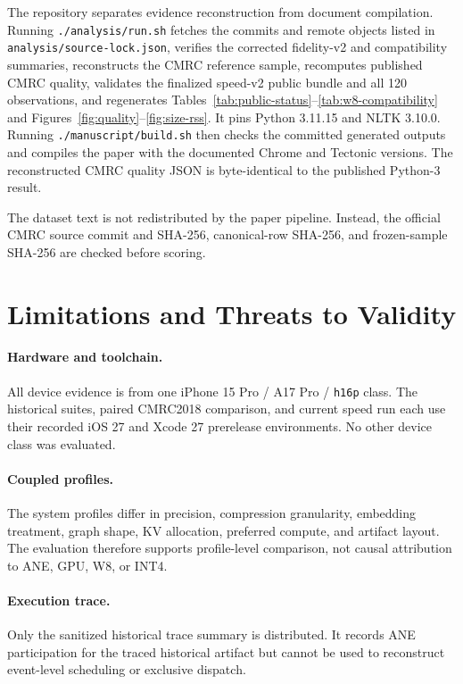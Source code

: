 \documentclass[10pt]{article}
\DeclareRobustCommand{\evidence}[1]{}
\DeclareRobustCommand{\artifact}[1]{\nolinkurl{#1}}
\begin{document}
The repository separates evidence reconstruction from document compilation. Running \artifact{./analysis/run.sh} fetches the commits and remote objects listed in \artifact{analysis/source-lock.json}, verifies the corrected fidelity-v2 and compatibility summaries, reconstructs the CMRC reference sample, recomputes published CMRC quality, validates the finalized speed-v2 public bundle and all 120 observations, and regenerates Tables~\ref{tab:public-status}--\ref{tab:w8-compatibility} and Figures~\ref{fig:quality}--\ref{fig:size-rss}. It pins Python 3.11.15 and NLTK 3.10.0. Running \artifact{./manuscript/build.sh} then checks the committed generated outputs and compiles the paper with the documented Chrome and Tectonic versions. The reconstructed CMRC quality JSON is byte-identical to the published Python-3 result.\evidence{CL-07,CL-12,CL-13,CL-23,CL-28}

The dataset text is not redistributed by the paper pipeline. Instead, the official CMRC source commit and SHA-256, canonical-row SHA-256, and frozen-sample SHA-256 are checked before scoring.\evidence{CL-12,CL-27}

\section{Limitations and Threats to Validity}

\paragraph{Hardware and toolchain.}
All device evidence is from one iPhone 15 Pro / A17 Pro / \artifact{h16p} class. The historical suites, paired CMRC2018 comparison, and current speed run each use their recorded iOS 27 and Xcode 27 prerelease environments.\evidence{CL-08,CL-10,CL-11} No other device class was evaluated.

\paragraph{Coupled profiles.}
The system profiles differ in precision, compression granularity, embedding treatment, graph shape, KV allocation, preferred compute, and artifact layout.\evidence{CL-04,CL-11} The evaluation therefore supports profile-level comparison, not causal attribution to ANE, GPU, W8, or INT4.

\paragraph{Execution trace.}
Only the sanitized historical trace summary is distributed. It records ANE participation for the traced historical artifact but cannot be used to reconstruct event-level scheduling or exclusive dispatch.\evidence{CL-09}
\end{document}
